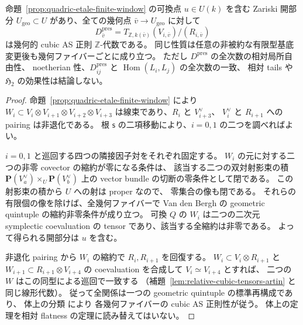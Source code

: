 \begin{proposition}
\label{prop:quadric-geometric-quintuple-open}
命題~\ref{prop:quadric-etale-finite-window} の可換点
$u\in U(k)$ を含む Zariski 開部分
$U_{\mathrm{geo}}\subset U$ があり、全ての幾何点
$\bar v\to U_{\mathrm{geo}}$ に対して
\[
 D^{\mathrm{pres}}_{\bar v}
       =T_{\mathbb Z,k(\bar v)}(V_{i,\bar v})/
                                  (R_{i,\bar v})
\]
は幾何的 cubic AS 正則 $\mathbb Z$-代数である。
同じ性質は任意の非被約な有限型基底変更後も幾何ファイバーごとに成り立つ。
ただし $D^{\mathrm{pres}}$ の全次数の相対局所自由性、
noetherian 性、$D^{\mathrm{pres}}_{ij}$ と
$\operatorname{Hom}(L_i,L_j)$ の全次数の一致、
相対 tails や $\mathfrak H_2$ の効果性は結論しない。
\end{proposition}
\begin{proof}
命題~\ref{prop:quadric-etale-finite-window} により
$W_i\subset V_i\otimes V_{i+1}\otimes V_{i+2}\otimes V_{i+3}$
は線束であり、$R_i$ と $V_{i+3}^{\vee}$、
$V_i^{\vee}$ と $R_{i+1}$ への pairing は非退化である。
根 $\mathsf s$ の二項移動により、$i=0,1$ の二つを調べればよい。

$i=0,1$ と巡回する四つの隣接因子対をそれぞれ固定する。
$W_i$ の元に対する二つの非零 covector の縮約が零になる条件は、
該当する二つの双対射影束の積
$\mathbf P(V_{a}^{\vee})\times_U\mathbf P(V_{b}^{\vee})$
上の vector bundle の切断の零条件として閉である。
この射影束の積から $U$ への射は proper なので、
零集合の像も閉である。
それらの有限個の像を除けば、全幾何ファイバーで
Van den Bergh の geometric quintuple の縮約非零条件が成り立つ。
可換 $Q$ の $W_i$ は二つの二次元 symplectic
coevaluation の tensor であり、該当する全縮約は非零である。
よって得られる開部分は $u$ を含む。

非退化 pairing から $W_i$ の縮約で $R_i,R_{i+1}$ を回復する。
$W_i\subset V_i\otimes R_{i+1}$ と
$W_{i+1}\subset R_{i+1}\otimes V_{i+4}$ の
coevaluation を合成して $V_i\simeq V_{i+4}$ とすれば、
二つの $W$ はこの同型による巡回で一致する
（補題~\ref{lem:relative-cubic-tensors-artin} と同じ線形代数）。
従って全関係は一つの geometric quintuple の標準再構成であり、
体上の分類 \cite[arXiv v3, Theorem 5.5.10]{VdB2011} により
各幾何ファイバーの cubic AS 正則性が従う。
体上の定理を相対 flatness の定理に読み替えてはいない。
\end{proof}


